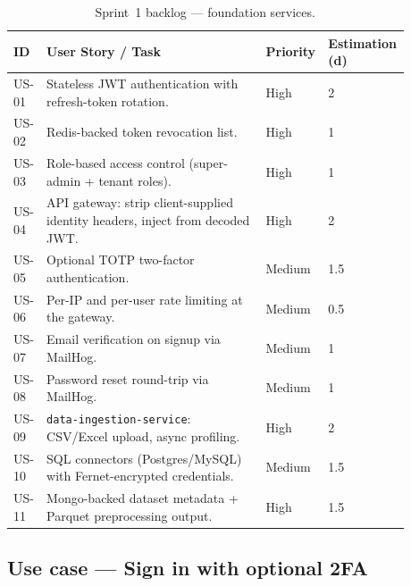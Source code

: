 \documentclass[12pt, a4paper, oneside]{report}
\begin{document}
\begin{table}[H]
\centering
\caption{Sprint~1 backlog --- foundation services.}
\label{tab:sprint1_backlog}
\begin{tabular}{|p{0.05\linewidth}|L{0.55\linewidth}|p{0.1\linewidth}|p{0.18\linewidth}|}
\hline
\textbf{ID} & \textbf{User Story / Task} & \textbf{Priority} & \textbf{Estimation (d)} \\
\hline
US-01 & Stateless JWT authentication with refresh-token rotation. & High & 2 \\ \hline
US-02 & Redis-backed token revocation list. & High & 1 \\ \hline
US-03 & Role-based access control (super-admin + tenant roles). & High & 1 \\ \hline
US-04 & API gateway: strip client-supplied identity headers, inject from decoded JWT. & High & 2 \\ \hline
US-05 & Optional TOTP two-factor authentication. & Medium & 1.5 \\ \hline
US-06 & Per-IP and per-user rate limiting at the gateway. & Medium & 0.5 \\ \hline
US-07 & Email verification on signup via MailHog. & Medium & 1 \\ \hline
US-08 & Password reset round-trip via MailHog. & Medium & 1 \\ \hline
US-09 & \texttt{data-ingestion-service}: CSV/Excel upload, async profiling. & High & 2 \\ \hline
US-10 & SQL connectors (Postgres/MySQL) with Fernet-encrypted credentials. & Medium & 1.5 \\ \hline
US-11 & Mongo-backed dataset metadata + Parquet preprocessing output. & High & 1.5 \\
\hline
\end{tabular}
\end{table}

\subsection{Use case --- Sign in with optional 2FA}
\end{document}
